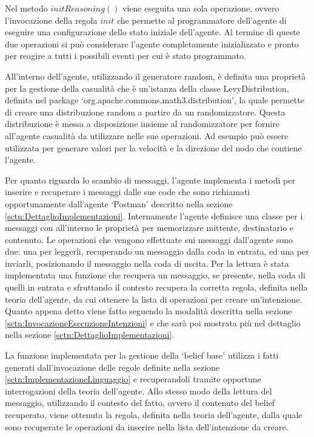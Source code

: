 Nel metodo $initReasoning()$ viene eseguita una sola operazione, ovvero l'invocazione della regola $init$ che permette al programmatore dell'agente di eseguire una configurazione dello stato iniziale dell'agente.
Al termine di queste due operazioni si può considerare l'agente completamente inizializzato e pronto per reagire a tutti i possibili eventi per cui è stato programmato.

All'interno dell'agente, utilizzando il generatore random, è definita una proprietà per la gestione della casualità che è un'istanza della classe LevyDistribution, definita nel package `org.apache.commons.math3.distribution', la quale permette di creare una distribuzione random a partire da un randomizzatore. Questa distribuzione è messa a disposizione insieme al randomizzatore per fornire all'agente casualità da utilizzare nelle sue operazioni. Ad esempio può essere utilizzata per generare valori per la velocità e la direzione del nodo che contiene l'agente.

Per quanto riguarda lo scambio di messaggi, l'agente implementa i metodi per inserire e recuperare i messaggi dalle sue code che sono richiamati opportunamente dall'agente `Postman' descritto nella sezione \ref{sctn:DettaglioImplementazioni}.
Internamente l'agente definisce una classe per i messaggi con all'interno le proprietà per memorizzare mittente, destinatario e contenuto.
Le operazioni che vengono effettuate sui messaggi dall'agente sono due: una per leggerli, recuperando un messaggio dalla coda in entrata, ed una per inviarli, posizionando il messaggio nella coda di uscita.
Per la lettura è stata implementata una funzione che recupera un messaggio, se presente, nella coda di quelli in entrata e sfruttando il contesto recupera la corretta regola, definita nella teoria dell'agente, da cui ottenere la lista di operazioni per creare un'intenzione. Quanto appena detto viene fatto seguendo la modalità descritta nella sezione \ref{sctn:InvocazioneEsecuzioneIntenzioni} e che sarà poi mostrata più nel dettaglio nella sezione \ref{sctn:DettaglioImplementazioni}.

La funzione implementata per la gestione della `belief base' utilizza i fatti generati dall'invocazione delle regole definite nella sezione \ref{sctn:ImplementazioneLinguaggio} e recuperandoli tramite opportune interrogazioni della teoria dell'agente. Allo stesso modo della lettura del messaggio, utilizzando il contesto del fatto, ovvero il contenuto del belief recuperato, viene ottenuta la regola, definita nella teoria dell'agente, dalla quale sono recuperate le operazioni da inserire nella lista dell'intenzione da creare.

